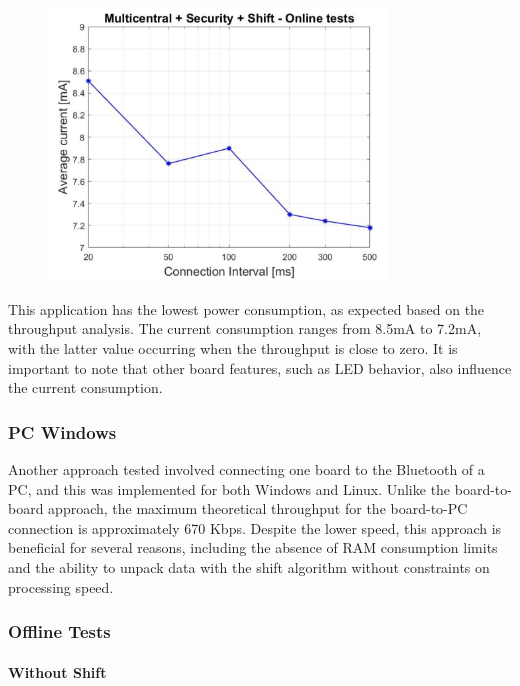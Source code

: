\documentclass{Configuration_Files/PoliMi3i_thesis}
\begin{document}
\begin{figure}[H]
    \centering
    \includegraphics[width=0.8\textwidth]{Results Manuel/figure32}
    \label{fig:figure1}
\end{figure}

This application has the lowest power consumption, as expected based on the throughput analysis. The current consumption ranges from 8.5mA to 7.2mA, with the latter value occurring when the throughput is close to zero. It is important to note that other board features, such as LED behavior, also influence the current consumption.

\subsubsection*{PC Windows}

Another approach tested involved connecting one board to the Bluetooth of a PC, and this was implemented for both Windows and Linux. Unlike the board-to-board approach, the maximum theoretical throughput for the board-to-PC connection is approximately 670 Kbps. Despite the lower speed, this approach is beneficial for several reasons, including the absence of RAM consumption limits and the ability to unpack data with the shift algorithm without constraints on processing speed.

\subsubsection*{Offline Tests}

\paragraph{Without Shift}
\end{document}
